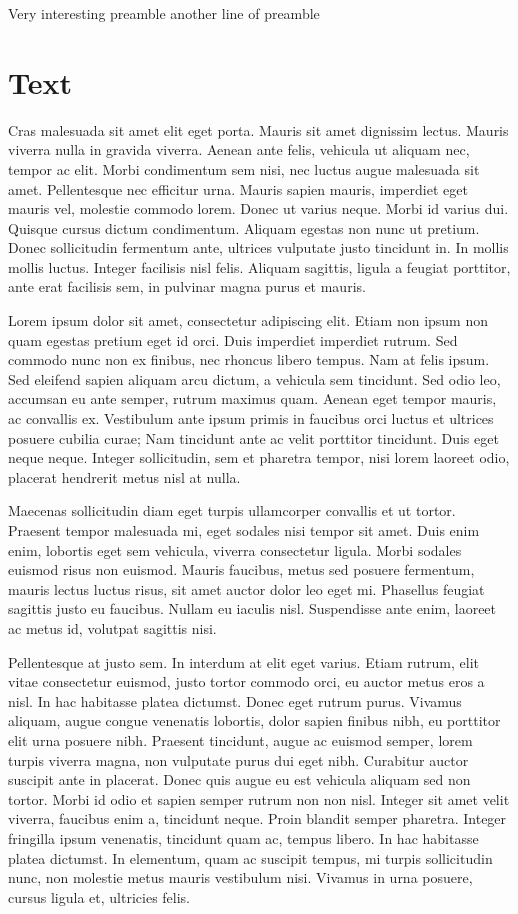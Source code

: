 Very interesting preamble
another line of preamble

\section{Text}
Cras malesuada sit amet elit eget porta. Mauris sit amet dignissim lectus. Mauris viverra nulla in gravida viverra. Aenean ante felis, vehicula ut aliquam nec, tempor ac elit. Morbi condimentum sem nisi, nec luctus augue malesuada sit amet. Pellentesque nec efficitur urna. Mauris sapien mauris, imperdiet eget mauris vel, molestie commodo lorem. Donec ut varius neque. Morbi id varius dui. Quisque cursus dictum condimentum. Aliquam egestas non nunc ut pretium. Donec sollicitudin fermentum ante, ultrices vulputate justo tincidunt in. In mollis mollis luctus. Integer facilisis nisl felis. Aliquam sagittis, ligula a feugiat porttitor, ante erat facilisis sem, in pulvinar magna purus et mauris.

Lorem ipsum dolor sit amet, consectetur adipiscing elit. Etiam non ipsum non quam egestas pretium eget id orci. Duis imperdiet imperdiet rutrum. Sed commodo nunc non ex finibus, nec rhoncus libero tempus. Nam at felis ipsum. Sed eleifend sapien aliquam arcu dictum, a vehicula sem tincidunt. Sed odio leo, accumsan eu ante semper, rutrum maximus quam. Aenean eget tempor mauris, ac convallis ex. Vestibulum ante ipsum primis in faucibus orci luctus et ultrices posuere cubilia curae; Nam tincidunt ante ac velit porttitor tincidunt. Duis eget neque neque. Integer sollicitudin, sem et pharetra tempor, nisi lorem laoreet odio, placerat hendrerit metus nisl at nulla.

Maecenas sollicitudin diam eget turpis ullamcorper convallis et ut tortor. Praesent tempor malesuada mi, eget sodales nisi tempor sit amet. Duis enim enim, lobortis eget sem vehicula, viverra consectetur ligula. Morbi sodales euismod risus non euismod. Mauris faucibus, metus sed posuere fermentum, mauris lectus luctus risus, sit amet auctor dolor leo eget mi. Phasellus feugiat sagittis justo eu faucibus. Nullam eu iaculis nisl. Suspendisse ante enim, laoreet ac metus id, volutpat sagittis nisi.

Pellentesque at justo sem. In interdum at elit eget varius. Etiam rutrum, elit vitae consectetur euismod, justo tortor commodo orci, eu auctor metus eros a nisl. In hac habitasse platea dictumst. Donec eget rutrum purus. Vivamus aliquam, augue congue venenatis lobortis, dolor sapien finibus nibh, eu porttitor elit urna posuere nibh. Praesent tincidunt, augue ac euismod semper, lorem turpis viverra magna, non vulputate purus dui eget nibh. Curabitur auctor suscipit ante in placerat. Donec quis augue eu est vehicula aliquam sed non tortor. Morbi id odio et sapien semper rutrum non non nisl. Integer sit amet velit viverra, faucibus enim a, tincidunt neque. Proin blandit semper pharetra. Integer fringilla ipsum venenatis, tincidunt quam ac, tempus libero. In hac habitasse platea dictumst. In elementum, quam ac suscipit tempus, mi turpis sollicitudin nunc, non molestie metus mauris vestibulum nisi. Vivamus in urna posuere, cursus ligula et, ultricies felis.

